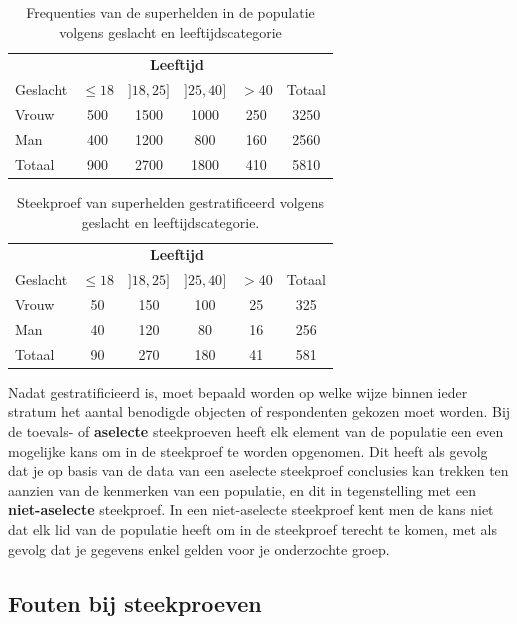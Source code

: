   \begin{table}
  \centering
    \begin{tabular}{l|cccc|c}
      & \multicolumn{4}{c|}{\textbf{Leeftijd}} & \\
      Geslacht & $\le 18$ & $]18,25]$ & $]25, 40]$ & $> 40$ & Totaal\\
      \hline
      Vrouw & 500 & 1500 & 1000 & 250 & 3250 \\
      Man   & 400 & 1200 & 800 & 160 & 2560\\
      \hline
      Totaal & 900 & 2700 & 1800 & 410 & 5810
    \end{tabular}
    \caption{Frequenties van de superhelden in de populatie volgens geslacht en leeftijdscategorie}
    \label{tab:heldenPopulatie1}
\end{table}

\begin{table}
  \centering
    \begin{tabular}{l|cccc|c}
      & \multicolumn{4}{c|}{\textbf{Leeftijd}} & \\
      Geslacht & $\le 18$ & $]18,25]$ & $]25, 40]$ & $> 40$ & Totaal\\
      \hline
      Vrouw & 50 & 150 & 100 & 25 & 325 \\
      Man   & 40 & 120 & 80 & 16 & 256\\
      \hline
      Totaal & 90 & 270 & 180 & 41 & 581
    \end{tabular}
      \caption{Steekproef van superhelden gestratificeerd volgens geslacht en leeftijdscategorie.}
    \label{tab:heldenPopulatie2}
  \end{table}

Nadat gestratificieerd is, moet bepaald worden op welke wijze binnen ieder stratum het aantal benodigde objecten of respondenten gekozen moet worden. Bij de toevals- of \textbf{aselecte}  steekproeven heeft elk element van de populatie een even mogelijke kans om in de steekproef te worden opgenomen. Dit heeft als gevolg dat je op basis van de data van een aselecte steekproef conclusies kan trekken ten aanzien van de kenmerken van een populatie, en dit in tegenstelling met een \textbf{niet-aselecte} steekproef. In een niet-aselecte steekproef kent men de kans niet dat elk lid van de populatie heeft om in de steekproef terecht te komen, met als gevolg dat je gegevens enkel gelden voor je onderzochte groep.

\subsection{Fouten bij steekproeven}

